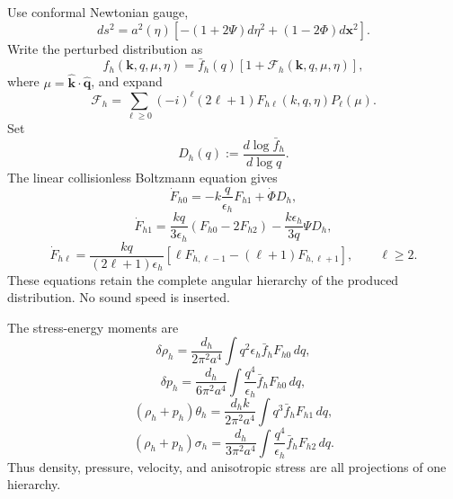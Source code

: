 Use conformal Newtonian gauge,
\begin{equation}
 ds^2=a^2(\eta)
 \left[-(1+2\Psi)d\eta^2+(1-2\Phi)d\mathbf x^2\right].
 \label{eq:cb-newtonian-gauge}
\end{equation}
Write the perturbed distribution as
\begin{equation}
 f_h(\mathbf k,q,\mu,\eta)
 =\bar f_h(q)
 \left[1+\mathcal F_h(\mathbf k,q,\mu,\eta)\right],
 \label{eq:cb-distribution-perturbation}
\end{equation}
where $\mu=\widehat{\mathbf k}\cdot\widehat{\mathbf q}$, and expand
\begin{equation}
 \mathcal F_h
 =\sum_{\ell\geq0}
 (-i)^\ell(2\ell+1)
 F_{h\ell}(k,q,\eta)P_\ell(\mu).
 \label{eq:cb-multipole-expansion}
\end{equation}
Set
\begin{equation}
 D_h(q):=\frac{d\log\bar f_h}{d\log q}.
 \label{eq:cb-log-derivative}
\end{equation}
The linear collisionless Boltzmann equation gives
\begin{equation}
 \dot F_{h0}
 =-k\frac{q}{\epsilon_h}F_{h1}
 +\dot\Phi D_h,
 \label{eq:cb-hierarchy-zero}
\end{equation}
\begin{equation}
 \dot F_{h1}
 =\frac{kq}{3\epsilon_h}
 \left(F_{h0}-2F_{h2}\right)
 -\frac{k\epsilon_h}{3q}\Psi D_h,
 \label{eq:cb-hierarchy-one}
\end{equation}
\begin{equation}
 \dot F_{h\ell}
 =\frac{kq}{(2\ell+1)\epsilon_h}
 \left[\ell F_{h,\ell-1}-(\ell+1)F_{h,\ell+1}\right],
 \qquad \ell\geq2.
 \label{eq:cb-hierarchy-general}
\end{equation}
These equations retain the complete angular hierarchy of the produced distribution.  No sound speed is inserted.

The stress-energy moments are
\begin{equation}
 \delta\rho_h
 =\frac{d_h}{2\pi^2a^4}
 \int q^2\epsilon_h\bar f_hF_{h0}\,dq,
 \label{eq:cb-delta-rho}
\end{equation}
\begin{equation}
 \delta p_h
 =\frac{d_h}{6\pi^2a^4}
 \int \frac{q^4}{\epsilon_h}\bar f_hF_{h0}\,dq,
 \label{eq:cb-delta-p}
\end{equation}
\begin{equation}
 (\rho_h+p_h)\theta_h
 =\frac{d_hk}{2\pi^2a^4}
 \int q^3\bar f_hF_{h1}\,dq,
 \label{eq:cb-theta}
\end{equation}
\begin{equation}
 (\rho_h+p_h)\sigma_h
 =\frac{d_h}{3\pi^2a^4}
 \int \frac{q^4}{\epsilon_h}\bar f_hF_{h2}\,dq.
 \label{eq:cb-sigma}
\end{equation}
Thus density, pressure, velocity, and anisotropic stress are all projections of one hierarchy.

